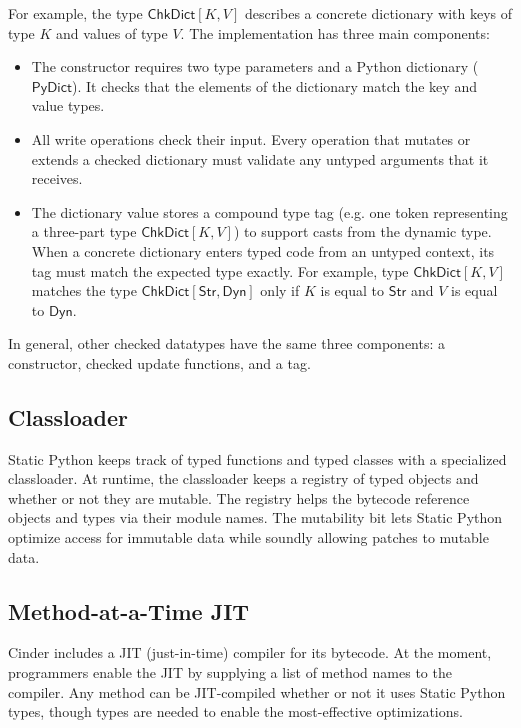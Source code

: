 \documentclass[english,cleveref,submission]{programming}
\newcommand{\SP}{Static Python}
\newcommand{\typefont}[1]{\mathsf{#1}}
\newcommand{\paramtype}[2]{#1[#2]}
\newcommand{\sptstr}{\typefont{Str}}
\newcommand{\sptdyn}{\typefont{Dyn}}
\newcommand{\sptrawpydict}{\typefont{PyDict}}
\newcommand{\sptchkdict}[2]{\paramtype{\typefont{ChkDict}}{#1, #2}}
\begin{document}
For example, the type $\sptchkdict{K}{V}$ describes a concrete dictionary
with keys of type $K$ and values of type $V$.
The implementation has three main components:
\begin{itemize}
  \item
    The constructor requires two type parameters and a Python dictionary ($\sptrawpydict$).
    It checks that the elements of the dictionary match the key and value types.
  \item
    All write operations check their input.
    Every operation that mutates or extends a checked dictionary must
    validate any untyped arguments that it receives.
  \item
    The dictionary value stores a compound type tag 
    (e.g. one token representing a three-part type $\sptchkdict{K}{V}$)
    to support casts from the dynamic type.
    When a concrete dictionary enters typed code from an untyped context,
    its tag must match the expected type exactly.
    For example, type $\sptchkdict{K}{V}$ matches the type
    $\sptchkdict{\sptstr}{\sptdyn}$ only if $K$ is equal to $\sptstr$
    and $V$ is equal to $\sptdyn$.
\end{itemize}
%
In general, other checked datatypes have the same three components:
a constructor, checked update functions, and a tag.


\subsection{Classloader}
\label{s:classloader}

\SP{} keeps track of typed functions and typed classes with a specialized classloader.
At runtime, the classloader keeps a registry of typed objects and whether or not they
are mutable.
The registry helps the bytecode reference objects and types via their module names.
The mutability bit lets \SP{} optimize access for immutable data while soundly allowing
patches to mutable data.


\subsection{Method-at-a-Time JIT}
\label{s:jit}

Cinder includes a JIT (just-in-time) compiler for its bytecode.
At the moment, programmers enable the JIT by supplying a list of method names
to the compiler.
Any method can be JIT-compiled whether or not it uses \SP{} types,
though types are needed to enable the most-effective optimizations.
\end{document}

